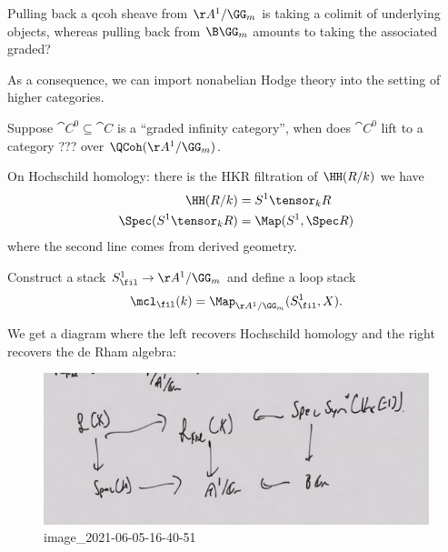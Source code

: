 \begin{remark}

Pulling back a qcoh sheave from \(\AA^1/\GG_m\) is taking a colimit of
underlying objects, whereas pulling back from \(\B \GG_m\) amounts to
taking the associated graded?

As a consequence, we can import nonabelian Hodge theory into the setting
of higher categories.

\end{remark}

\begin{question}

Suppose \(\cat{C}^0 \subseteq \cat{C}\) is a ``graded infinity
category'', when does \(\cat{C}^0\) lift to a category ??? over
\(\QCoh(\AA^1/\GG_m)\).

\end{question}

\begin{remark}

On Hochschild homology: there is the HKR filtration of \(\HH(R/k)\) we
have
\begin{align*}
\HH(R/k) &= S^1 \tensor_k R \\
\Spec (S^1 \tensor_k R) &= \Map(S^1, \Spec R)
\end{align*}
where the second line comes from derived geometry.

\end{remark}

\begin{theorem}[MRT]

Construct a stack \(S^1_\fil \to\AA^1/\GG_m\) and define a loop stack
\begin{align*}
\mcl_\fil(k) = \Map_{\AA^1/\GG_m} (S^1_\fil, X)
.\end{align*}

We get a diagram where the left recovers Hochschild homology and the
right recovers the de Rham algebra:

\begin{figure}
\centering
\includegraphics{figures/image_2021-06-05-16-40-51.png}
\caption{image\_2021-06-05-16-40-51}
\end{figure}

\end{theorem}

